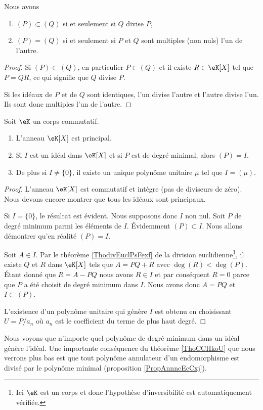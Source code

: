 \begin{lemma}
    Nous avons
    \begin{enumerate}
        \item
            \( (P)\subset (Q)\) si et seulement si \( Q\) divise \( P\),
        \item
            \( (P)=(Q)\) si et seulement si \( P\) et \( Q\) sont multiples (non nuls) l'un de l'autre.
    \end{enumerate}
\end{lemma}

\begin{proof}
    Si \( (P)\subset (Q)\), en particulier \( P\in(Q)\) et il existe \( R\in\eK[X]\) tel que \( P=QR\), ce qui signifie que \( Q\) divise \( P\).

    Si les idéaux de \( P\) et de \( Q\) sont identiques, l'un divise l'autre et l'autre divise l'un. Ils sont donc multiples l'un de l'autre.
\end{proof}

\begin{theorem}     \label{ThoCCHkoU}
    Soit \( \eK\) un corps commutatif.
    \begin{enumerate}
        \item
            L'anneau \( \eK[X]\) est principal. 
        \item
            Si \( I\) est un idéal dans \( \eK[X]\) et si \( P\) est de degré minimal, alors \( (P)=I\).
        \item   \label{ITEMooASHKooZqkiCH}
            De plus si \( I\neq \{  0\}\), il existe un unique polynôme unitaire \( \mu\) tel que \( I=(\mu)\).
    \end{enumerate}
\end{theorem}

\begin{proof}
    L'anneau \( \eK[X]\) est commutatif et intègre (pas de diviseurs de zéro). Nous devons encore montrer que tous les idéaux sont principaux.

    Si \( I=\{ 0 \}\), le résultat est évident. Nous supposons donc \( I\) non nul. Soit \( P\) de degré minimum parmi les éléments de \( I\). Évidemment \( (P)\subset I\). Nous allons démontrer qu'en réalité \( (P)=I\).

    Soit \( A\in I\). Par le théorème \ref{ThodivEuclPsFexf} de la division euclidienne\footnote{Ici \( \eK\) est un corps et donc l'hypothèse d'inversibilité est automatiquement vérifiée.}, il existe \( Q\) et \( R\) dans \( \eK[X]\) tels que \( A=PQ+R\) avec \( \deg(R)<\deg(P)\). Étant donné que \( R=A-PQ\) nous avons \( R\in I\) et par conséquent \( R=0\) parce que \( P\) a été choisit de degré minimum dans \( I\). Nous avons donc \( A=PQ\) et \( I\subset (P)\).

    L'existence d'un polynôme unitaire qui génère \( I\) est obtenu en choisissant \( U=P/a_n\) où \( a_n\) est le coefficient du terme de plus haut degré.
\end{proof}
Nous voyons que n'importe quel polynôme de degré minimum dans un idéal génère l'idéal. Une importante conséquence du théorème \ref{ThoCCHkoU} que nous verrons plus bas est que tout polynôme annulateur d'un endomorphisme est divisé par le polynôme minimal (proposition \ref{PropAnnncEcCxj}).

